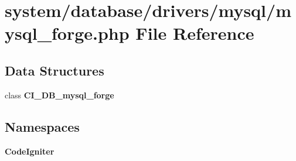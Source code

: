 \section{system/database/drivers/mysql/mysql\-\_\-forge.php File Reference}
\label{mysql__forge_8php}
\subsection*{Data Structures}
\begin{DoxyCompactItemize}
\item 
class {\bf C\-I\-\_\-\-D\-B\-\_\-mysql\-\_\-forge}
\end{DoxyCompactItemize}
\subsection*{Namespaces}
\begin{DoxyCompactItemize}
\item 
{\bf Code\-Igniter}
\end{DoxyCompactItemize}
